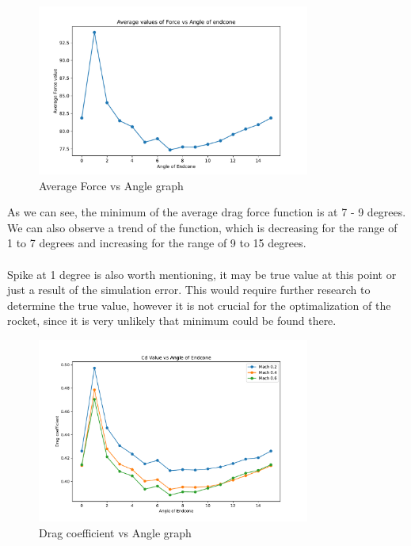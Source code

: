 \documentclass{article}
\begin{document}
\begin{figure}[H]
    \centering
    \includegraphics[width=0.8\textwidth]{../data/R6-Parametric-Endcone/ForceVsAngle.pdf}
    \caption{Average Force vs Angle graph}
\end{figure}
As we can see, the minimum of the average drag force function is at 7 - 9 degrees. We can also 
observe a trend of the function, which is decreasing for the range of 1 to 7 degrees and increasing
for the range of 9 to 15 degrees.\\\\
Spike at 1 degree is also worth mentioning, it may be true value at this point or just a result of
the simulation error. This would require further research to determine the true value, however 
it is not crucial for the optimalization of the rocket, since it is very unlikely that minimum 
could be found there.

\begin{figure}[H]
    \centering
    \includegraphics[width=0.8\textwidth]{../data/R6-Parametric-Endcone/CdVsAngle.pdf}
    \caption{Drag coefficient vs Angle graph}
\end{figure}

\newpage
\end{document}

